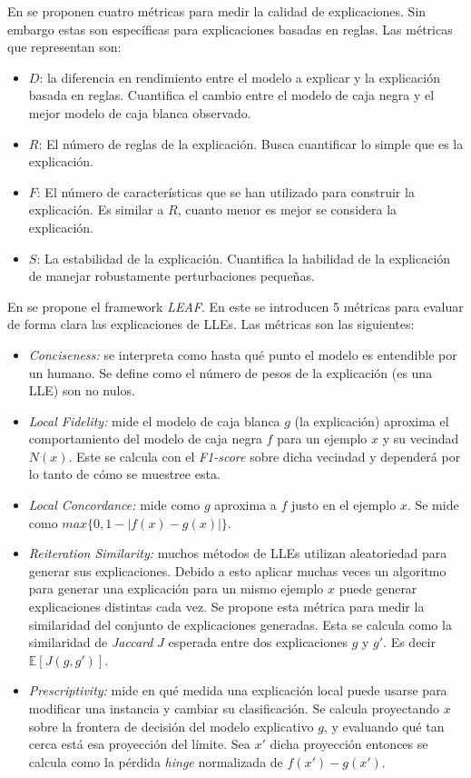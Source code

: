 En \cite{metricasReglas} se proponen cuatro métricas para medir la calidad de explicaciones. Sin embargo estas son específicas para explicaciones basadas en reglas. Las métricas que representan son:
\begin{itemize}
\item $D$: la diferencia en rendimiento entre el modelo a explicar y la explicación basada en reglas. Cuantifica el cambio entre el modelo de caja negra y el mejor modelo de caja blanca observado.
\item $R$: El número de reglas de la explicación. Busca cuantificar lo simple que es la explicación.
\item $F$: El número de características que se han utilizado para construir la explicación. Es similar a $R$, cuanto menor es mejor se considera la explicación.
\item $S$: La estabilidad de la explicación. Cuantifica la habilidad de la explicación de manejar robustamente perturbaciones pequeñas.
\end{itemize} 

En \cite{LEAF} se propone el framework \textit{LEAF}. En este se introducen 5 métricas para evaluar de forma clara las explicaciones de LLEs. Las métricas son las siguientes:

\begin{itemize}
\item \textit{Conciseness: }se interpreta como hasta qué punto el modelo es entendible por un humano. Se define como el número de pesos de la explicación (es una LLE) son no nulos.
\item \textit{Local Fidelity: }mide el modelo de caja blanca $g$ (la explicación) aproxima el comportamiento del modelo de caja negra $f$ para un ejemplo $x$ y su vecindad $N(x)$. Este se calcula con el \textit{F1-score} sobre dicha vecindad y dependerá por lo tanto de cómo se muestree esta. 
\item \textit{Local Concordance: }mide como $g$ aproxima a $f$ justo en el ejemplo $x$. Se mide como $max\{0, 1-|f(x)-g(x)|\}$.  
\item \textit{Reiteration Similarity: }muchos métodos de LLEs utilizan aleatoriedad para generar sus explicaciones. Debido a esto aplicar muchas veces un algoritmo para generar una explicación para un mismo ejemplo $x$ puede generar explicaciones distintas cada vez. Se propone esta métrica para medir la similaridad del conjunto de explicaciones generadas. Esta se calcula como la similaridad de \textit{Jaccard} $J$ esperada entre dos explicaciones $g$ y $g'$. Es decir $\mathbb{E}[J(g,g')]$.
\item \textit{Prescriptivity: }mide en qué medida una explicación local puede usarse para modificar una instancia y cambiar su clasificación. Se calcula proyectando $x$ sobre la frontera de decisión del modelo explicativo $g$, y evaluando qué tan cerca está esa proyección del límite. Sea $x'$ dicha proyección entonces se calcula como la pérdida \textit{hinge} normalizada de $f(x')-g(x')$.
\end{itemize}


